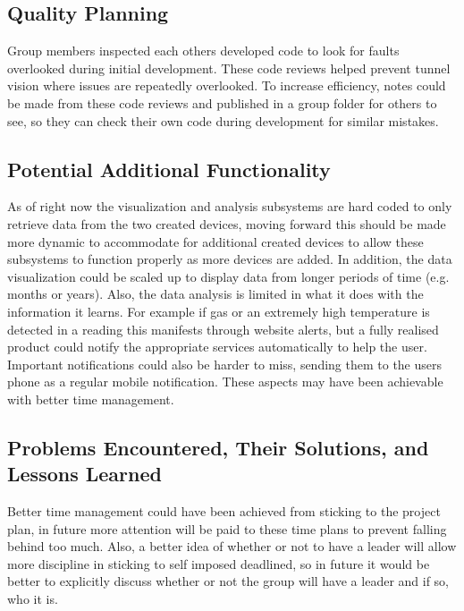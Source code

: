 \documentclass[]{report}
\begin{document}
	\subsection{Quality Planning}
	Group members inspected each others developed code to look for faults overlooked during initial development. These code reviews helped prevent tunnel vision where issues are repeatedly overlooked. To increase efficiency, notes could be made from these code reviews and published in a group folder for others to see, so they can check their own code during development for similar mistakes.
	
	\subsection{Potential Additional Functionality}
	As of right now the visualization and analysis subsystems are hard coded to only retrieve data from the two created devices, moving forward this should be made more dynamic to accommodate for additional created devices to allow these subsystems to function properly as more devices are added. In addition, the data visualization could be scaled up to display data from longer periods of time (e.g. months or years). Also, the data analysis is limited in what it does with the information it learns. For example if gas or an extremely high temperature is detected in a reading this manifests through website alerts, but a fully realised product could notify the appropriate services automatically to help the user. Important notifications could also be harder to miss, sending them to the users phone as a regular mobile notification. These aspects may have been achievable with better time management.
	
	
	\subsection{Problems Encountered, Their Solutions, and Lessons Learned}
	Better time management could have been achieved from sticking to the project plan, in future more attention will be paid to these time plans to prevent falling behind too much. Also, a better idea of whether or not to have a leader will allow more discipline in sticking to self imposed deadlined, so in future it would be better to explicitly discuss whether or not the group will have a leader and if so, who it is.
	
\end{document}
